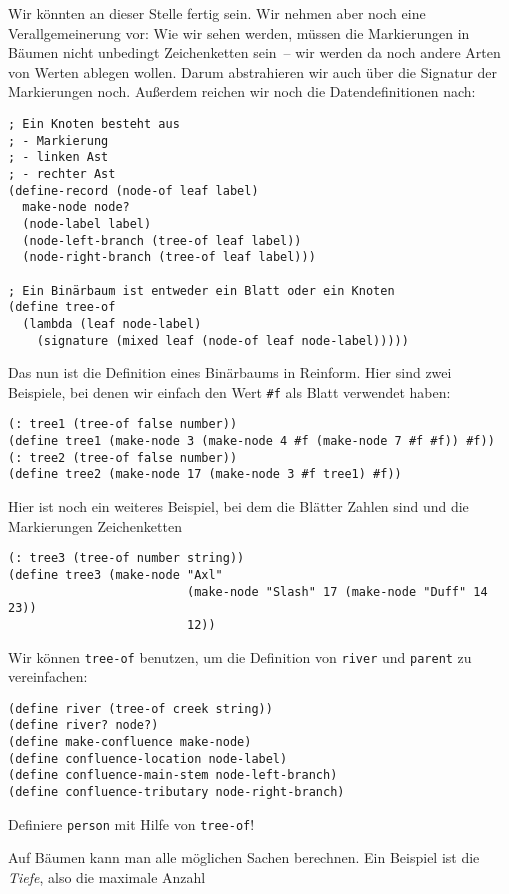 Wir könnten an dieser Stelle fertig sein.  Wir nehmen aber noch eine
Verallgemeinerung vor: Wie wir sehen werden, müssen die Markierungen
in Bäumen nicht unbedingt Zeichenketten sein~-- wir werden da noch
andere Arten von Werten ablegen wollen.  Darum abstrahieren wir auch
über die Signatur der Markierungen noch.  Außerdem reichen wir noch
die Datendefinitionen nach:
%
\begin{lstlisting}
; Ein Knoten besteht aus
; - Markierung
; - linken Ast
; - rechter Ast
(define-record (node-of leaf label)
  make-node node?
  (node-label label)
  (node-left-branch (tree-of leaf label))
  (node-right-branch (tree-of leaf label)))

; Ein Binärbaum ist entweder ein Blatt oder ein Knoten
(define tree-of
  (lambda (leaf node-label)
    (signature (mixed leaf (node-of leaf node-label)))))
\end{lstlisting}
%
Das nun ist die Definition eines Binärbaums in Reinform.  Hier sind
zwei Beispiele, bei denen wir einfach den Wert \lstinline{#f} als
Blatt verwendet haben:
%
\begin{lstlisting}
(: tree1 (tree-of false number))
(define tree1 (make-node 3 (make-node 4 #f (make-node 7 #f #f)) #f))
(: tree2 (tree-of false number))
(define tree2 (make-node 17 (make-node 3 #f tree1) #f))
\end{lstlisting}
%
Hier ist noch ein weiteres Beispiel, bei dem die Blätter Zahlen sind
und die Markierungen Zeichenketten
\begin{lstlisting}
(: tree3 (tree-of number string))
(define tree3 (make-node "Axl"
                         (make-node "Slash" 17 (make-node "Duff" 14 23))
                         12))
\end{lstlisting}
%
Wir können \lstinline{tree-of} benutzen, um die Definition von
\lstinline{river} und \lstinline{parent} zu vereinfachen:
%
\begin{lstlisting}
(define river (tree-of creek string))
(define river? node?)
(define make-confluence make-node)
(define confluence-location node-label)
(define confluence-main-stem node-left-branch)
(define confluence-tributary node-right-branch)
\end{lstlisting}
%
\begin{aufgabeinline}
  Definiere \lstinline{person} mit Hilfe von \lstinline{tree-of}!
\end{aufgabeinline}
%
Auf Bäumen kann man alle möglichen Sachen berechnen.  Ein Beispiel ist
die \textit{Tiefe}, also die maximale Anzahl
